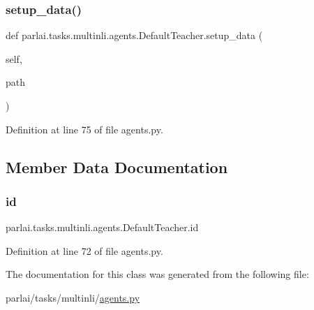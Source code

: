 \subsubsection{\texorpdfstring{setup\+\_\+data()}{setup\_data()}}
{\footnotesize\ttfamily def parlai.\+tasks.\+multinli.\+agents.\+Default\+Teacher.\+setup\+\_\+data (\begin{DoxyParamCaption}\item[{}]{self,  }\item[{}]{path }\end{DoxyParamCaption})}



Definition at line 75 of file agents.\+py.



\subsection{Member Data Documentation}
\mbox{\label{classparlai_1_1tasks_1_1multinli_1_1agents_1_1DefaultTeacher_a2eacc99d6289f9184e166de045beeade}} 
\subsubsection{\texorpdfstring{id}{id}}
{\footnotesize\ttfamily parlai.\+tasks.\+multinli.\+agents.\+Default\+Teacher.\+id}



Definition at line 72 of file agents.\+py.



The documentation for this class was generated from the following file\+:\begin{DoxyCompactItemize}
\item 
parlai/tasks/multinli/\hyperlink{parlai_2tasks_2multinli_2agents_8py}{agents.\+py}\end{DoxyCompactItemize}
